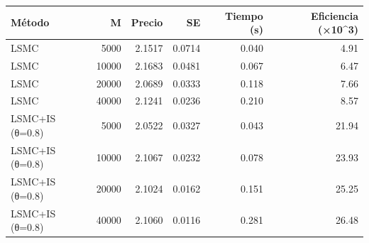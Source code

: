 \begin{tabular}{p{3.3cm}rrrrr}
\toprule
Método & M & Precio & SE & Tiempo (s) & Eficiencia (×10^3) \\
\midrule
LSMC & 5000 & 2.1517 & 0.0714 & 0.040 & 4.91 \\
LSMC & 10000 & 2.1683 & 0.0481 & 0.067 & 6.47 \\
LSMC & 20000 & 2.0689 & 0.0333 & 0.118 & 7.66 \\
LSMC & 40000 & 2.1241 & 0.0236 & 0.210 & 8.57 \\
LSMC+IS (θ=0.8) & 5000 & 2.0522 & 0.0327 & 0.043 & 21.94 \\
LSMC+IS (θ=0.8) & 10000 & 2.1067 & 0.0232 & 0.078 & 23.93 \\
LSMC+IS (θ=0.8) & 20000 & 2.1024 & 0.0162 & 0.151 & 25.25 \\
LSMC+IS (θ=0.8) & 40000 & 2.1060 & 0.0116 & 0.281 & 26.48 \\
\bottomrule
\end{tabular}
